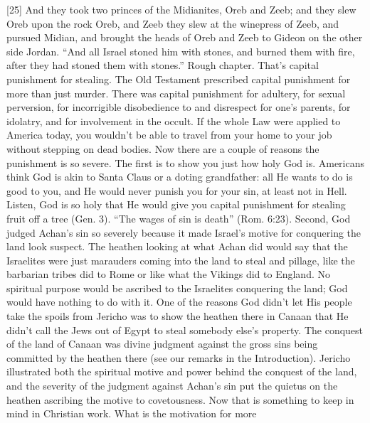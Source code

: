 [25] \textcolor[rgb]{0.00,0.00,1.00}{And they took two princes of the Midianites, Oreb and Zeeb; and they slew Oreb upon the rock Oreb, and Zeeb they slew at the winepress of Zeeb, and pursued Midian, and brought the heads of Oreb and Zeeb to Gideon on the other side Jordan.}%
“And all Israel stoned him with stones, and burned them with fire, after they had
stoned them with stones.” Rough chapter. That’s capital punishment for stealing. The Old
Testament prescribed capital punishment for
more than just murder. There was capital
punishment for adultery, for sexual perversion,
for incorrigible disobedience to and disrespect
for one’s parents, for idolatry, and for
involvement in the occult. If the whole Law
were applied to America today, you wouldn’t
be able to travel from your home to your job
without stepping on dead bodies.
Now there are a couple of reasons the
punishment is so severe. The first is to show
you just how holy God is. Americans think God
is akin to Santa Claus or a doting grandfather:
all He wants to do is good to you, and He
would never punish you for your sin, at least
not in Hell. Listen, God is so holy that He
would give you capital punishment for stealing
fruit off a tree (Gen. 3). “The wages of sin is
death” (Rom. 6:23).
Second, God judged Achan’s sin so
severely because it made Israel’s motive for
conquering the land look suspect. The heathen
looking at what Achan did would say that the
Israelites were just marauders coming into the
land to steal and pillage, like the barbarian tribes
did to Rome or like what the Vikings did to
England. No spiritual purpose would be
ascribed to the Israelites conquering the land;
God would have nothing to do with it.
One of the reasons God didn’t let His
people take the spoils from Jericho was to show
the heathen there in Canaan that He didn’t call
the Jews out of Egypt to steal somebody else’s
property. The conquest of the land of Canaan
was divine judgment against the gross sins being
committed by the heathen there (see our
remarks in the Introduction). Jericho illustrated
both the spiritual motive and power behind the
conquest of the land, and the severity of the
judgment against Achan’s sin put the quietus on
the heathen ascribing the motive to
covetousness.
Now that is something to keep in mind in
Christian work. What is the motivation for more
